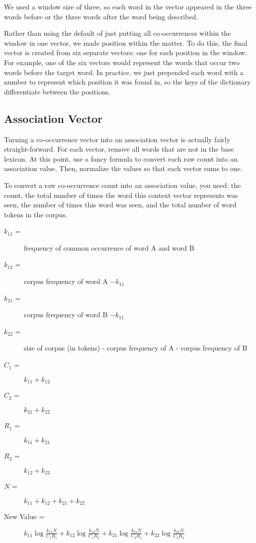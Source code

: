 \documentclass[12pt]{article}
\begin{document}
We used a window size of three, so each word in the
vector appeared in the three words before or the three words after the word
being described.

Rather than using the default of just putting all co-occurrences within the
window in one vector, we made position within the matter. To do this, the
final vector is created from six separate vectors: one for each position in
the window. For example, one of the six vectors would represent the words that
occur two words before the target word. In practice, we just prepended each
word with a number to represent which position it was found in, so the keys of
the dictionary differentiate between the positions.

\subsection{Association Vector}

Turning a co-occurrence vector into an association vector is actually fairly
straight-forward. For each vector, remove all words that are not in the base
lexicon. At this point, use a fancy formula to convert each raw count into an
association value.  Then, normalize the values so that each vector sums to
one.

To convert a raw co-occurrence count into an association value, you need: the
count, the total number of times the word this context vector represents was
seen, the number of times this word was seen, and the total number of word
tokens in the corpus.

\begin{description}
\item[$k_{11}$ =] frequency of common occurrence of word A and word B
\item[$k_{12}$ =] corpus frequency of word A $- k_{11}$
\item[$k_{21}$ =] corpus frequency of word B $- k_{11}$
\item[$k_{22}$ =] size of corpus (in tokens) - corpus frequency of A - corpus frequency of B
\item[$C_1$ =] $k_{11} + k_{12}$
\item[$C_2$ =] $k_{21} + k_{22}$
\item[$R_1$ =] $k_{11} + k_{21}$
\item[$R_2$ =] $k_{12} + k_{22}$
\item[$N$ =] $k_{11} + k_{12} + k_{21} + k_{22}$
\item[New Value = ]
    $k_{11}\log\frac{k_{11}N}{C_1R_1} +
    k_{12}\log\frac{k_{12}N}{C_1R_2} +
    k_{21}\log\frac{k_{21}N}{C_2R_1} +
    k_{22}\log\frac{k_{22}N}{C_2R_2}$
\end{description}
\end{document}
